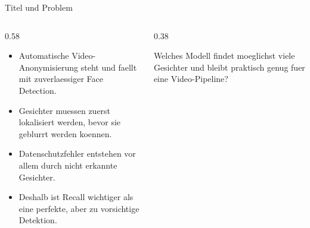 \begin{frame}{Titel und Problem}
\begin{columns}[T,onlytextwidth]
\begin{column}{0.58\textwidth}
\begin{itemize}
    \item Automatische Video-Anonymisierung steht und faellt mit zuverlaessiger Face Detection.
    \item Gesichter muessen zuerst lokalisiert werden, bevor sie geblurrt werden koennen.
    \item Datenschutzfehler entstehen vor allem durch nicht erkannte Gesichter.
    \item Deshalb ist Recall wichtiger als eine perfekte, aber zu vorsichtige Detektion.
\end{itemize}
\end{column}
\begin{column}{0.38\textwidth}
\begin{mynote}[Leitfrage]
Welches Modell findet moeglichst viele Gesichter und bleibt praktisch genug fuer eine Video-Pipeline?
\end{mynote}
\end{column}
\end{columns}
\end{frame}
